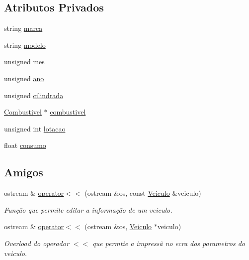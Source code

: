 \subsection*{Atributos Privados}
\begin{DoxyCompactItemize}
\item 
string \hyperlink{class_veiculo_ab20b89442a0ddaedd074bb0de75838c8}{marca}
\item 
string \hyperlink{class_veiculo_a313c15811b7fffa4787eea0dcf12fc13}{modelo}
\item 
unsigned \hyperlink{class_veiculo_ac4146f7b3d38e31e3225074e0fb0dea9}{mes}
\item 
unsigned \hyperlink{class_veiculo_ae141824a9353b3f7ed99d5c34c830fe2}{ano}
\item 
unsigned \hyperlink{class_veiculo_a3c3b3f2f958a98b48fa5e4f46007c9f9}{cilindrada}
\item 
\hyperlink{class_combustivel}{Combustivel} $\ast$ \hyperlink{class_veiculo_ad8416cc9da449baed5e07ed146572712}{combustivel}
\item 
unsigned int \hyperlink{class_veiculo_af9dc20956b1b60e54b9a79f76cd971d3}{lotacao}
\item 
float \hyperlink{class_veiculo_ab403615f82fdad74215512cedce23762}{consumo}
\end{DoxyCompactItemize}
\subsection*{Amigos}
\begin{DoxyCompactItemize}
\item 
ostream \& \hyperlink{class_veiculo_abd6e2d8cf61fd95d821137237fe1d043}{operator$<$$<$} (ostream \&os, const \hyperlink{class_veiculo}{Veiculo} \&veiculo)
\begin{DoxyCompactList}\small\item\em Função que permite editar a informação de um veiculo. \end{DoxyCompactList}\item 
ostream \& \hyperlink{class_veiculo_ab1e5fb7dfcdaf15014ab3363dd4f8dc1}{operator$<$$<$} (ostream \&os, \hyperlink{class_veiculo}{Veiculo} $\ast$veiculo)
\begin{DoxyCompactList}\small\item\em Overload do operador $<$$<$ que permtie a impressã no ecra dos parametros do veiculo. \end{DoxyCompactList}\end{DoxyCompactItemize}


